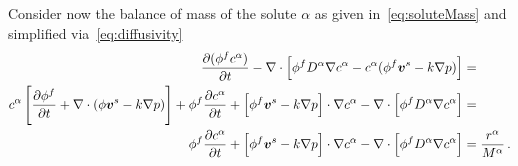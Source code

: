 \documentclass[a4paper,DIV=12,10pt]{scrartcl}
\newcommand{\V}[0]{\vek{v}}
\begin{document}
Consider now the balance of mass of the solute $\alpha$ as given
in~\eqref{eq:soluteMass} and simplified via~\eqref{eq:diffusivity}
\begin{equation} \label{eq:soluteMass2}
  \begin{aligned}
    \frac{ \partial(\phi^f c^\alpha)}{\partial t} - \nabla \cdot \left[ \phi^f
      D^\alpha \nabla c^\alpha
      - c^\alpha (\phi^f \V^s - k \nabla p) \right] &=\\
    c^\alpha \left[ \frac{\partial \phi^f}{\partial t} + \nabla \cdot (\phi
      \V^s - k \nabla p) \right] + \phi^f \frac{\partial c^\alpha}{\partial t}
    + \left[ \phi^f \V^s - k \nabla p \right] \cdot \nabla c^\alpha -
    \nabla \cdot \left[ \phi^f D^\alpha \nabla c^\alpha \right] &= \\
    \phi^f \frac{\partial c^\alpha}{\partial t} + \left[ \phi^f \V^s - k
      \nabla p \right] \cdot \nabla c^\alpha 
    - \nabla \cdot \left[ \phi^f D^\alpha \nabla c^\alpha \right] &= 
    \frac{r^\alpha}{M^\alpha}\,.
\end{aligned}
\end{equation}

\begin{comment}
Performing similar steps that lead to~\eqref{eq:molecularFlux2} for the
balance of mass of the solid phase, one gets
\begin{equation}
  \label{eq:solidMass}
  \rho^s_T \left[ \frac{\partial \phi^s}{\partial t} + \nabla \cdot (\phi^s
    \V^s) \right] + \phi^s \left[ \frac{\partial \rho_T^s}{\partial t} + \V^s
    \cdot \nabla \rho_T^s \right] = 0\,.
\end{equation}
In case of an incompressible solid material, the second term vanishes and the
first term has to be zero too. Adding now this first term to the fluid mass
balance~\eqref{eq:fluidMass2}, one gets
\begin{equation}
  \label{eq:mixtureMass2}
  \frac{ \partial (\phi^f + \phi^s) }{\partial t} + \nabla \cdot \left[
    \phi^f \V^s - k \nabla p + \phi^s \V^s \right] = 0\,.
\end{equation}
Based on the previous assumption that the solute volume fractions are
negligible, we have $\phi^f + \phi^s = 1$ and, therefore, 
\begin{equation}
  \label{eq:mixtureMass3}
  \nabla \cdot \left[ \V^s - k \nabla p \right] = 0\,.
\end{equation}

\end{comment}
\end{document}
